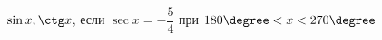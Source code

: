 \begin{ex}[type=simplify_calculate]
	\begin{condition}
		\( \sin x, \ctg x \), \quad если \( \sec x=-\dfrac{5}{4} \) при \( 180\degree<x<270\degree \)
	\end{condition}
\end{ex}